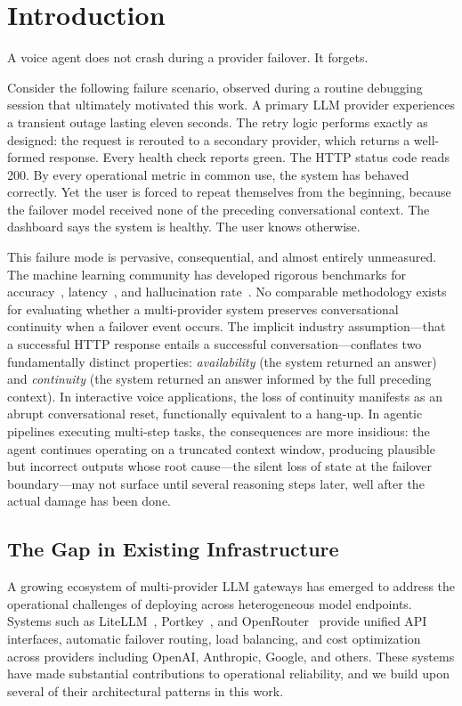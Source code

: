 \section{Introduction}
\label{sec:introduction}

A voice agent does not crash during a provider failover. It forgets.

Consider the following failure scenario, observed during a routine debugging session that ultimately motivated this work. A primary LLM provider experiences a transient outage lasting eleven seconds. The retry logic performs exactly as designed: the request is rerouted to a secondary provider, which returns a well-formed response. Every health check reports green. The HTTP status code reads 200. By every operational metric in common use, the system has behaved correctly. Yet the user is forced to repeat themselves from the beginning, because the failover model received none of the preceding conversational context. The dashboard says the system is healthy. The user knows otherwise.

This failure mode is pervasive, consequential, and almost entirely unmeasured. The machine learning community has developed rigorous benchmarks for accuracy~\cite{mmlu}, latency~\cite{anyscale-benchmark}, and hallucination rate~\cite{halueval}. No comparable methodology exists for evaluating whether a multi-provider system preserves conversational continuity when a failover event occurs. The implicit industry assumption---that a successful HTTP response entails a successful conversation---conflates two fundamentally distinct properties: \textit{availability} (the system returned an answer) and \textit{continuity} (the system returned an answer informed by the full preceding context). In interactive voice applications, the loss of continuity manifests as an abrupt conversational reset, functionally equivalent to a hang-up. In agentic pipelines executing multi-step tasks, the consequences are more insidious: the agent continues operating on a truncated context window, producing plausible but incorrect outputs whose root cause---the silent loss of state at the failover boundary---may not surface until several reasoning steps later, well after the actual damage has been done.

\subsection{The Gap in Existing Infrastructure}

A growing ecosystem of multi-provider LLM gateways has emerged to address the operational challenges of deploying across heterogeneous model endpoints. Systems such as LiteLLM~\cite{litellm}, Portkey~\cite{portkey}, and OpenRouter~\cite{openrouter} provide unified API interfaces, automatic failover routing, load balancing, and cost optimization across providers including OpenAI, Anthropic, Google, and others. These systems have made substantial contributions to operational reliability, and we build upon several of their architectural patterns in this work.

